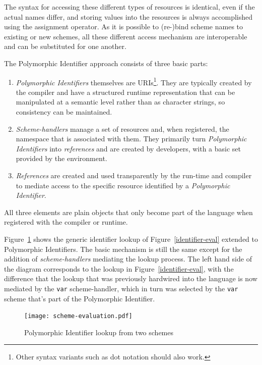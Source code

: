 \documentclass[preprint]{sigplanconf}
\begin{document}
The syntax for accessing these different types of resources is identical, even if the actual
names differ, and storing values into the resources is always accomplished using the assignment operator.
As it is possible to (re-)bind scheme names to existing or new schemes, all these different access 
mechanism are interoperable and can be substituted for one another.

The Polymorphic Identifier approach consists of three basic parts:
\begin{enumerate}
\item \emph{Polymorphic Identifiers} themselves are URIs\footnote{Other syntax variants such as dot notation should also work.}.
	  They are typically created by the 
	compiler and have a structured runtime representation that can be manipulated
	at a semantic level rather than as character strings, so consistency can be 
	maintained.
\item \emph{Scheme-handlers} manage a set of resources and, when registered,
	 the namespace that is associated
	with them.  They primarily turn \emph{Polymorphic Identifiers} into \emph{references} and
	are created by developers, with a basic set provided by the environment.
\item \emph{References} are created and used transparently by the run-time and compiler
	to mediate access to the specific resource identified by a \emph{Polymorphic Identifier}.
	
	
\end{enumerate}

All three elements are plain objects that only become part of the language when registered
with the compiler or runtime.

Figure~\ref{scheme-eval} shows the generic identifier lookup of Figure~\ref{identifier-eval}
extended to Polymorphic Identifiers.  The basic mechanism is still the same except for the
addition of \emph{scheme-handlers} mediating the lookup process.  The left hand side of the
diagram corresponds to the lookup in Figure~\ref{identifier-eval}, with the difference that
the lookup that was previously hardwired into the language is now mediated by the {\tt var}
scheme-handler, which in turn was selected by the {\tt var} scheme that's part of the 
Polymorphic Identifier.


\begin{figure}[htbp]
\centering\texttt{[image: scheme-evaluation.pdf]}
\caption{Polymorphic Identifier lookup from two schemes}
\label{scheme-eval}
\end{figure}
\end{document}
